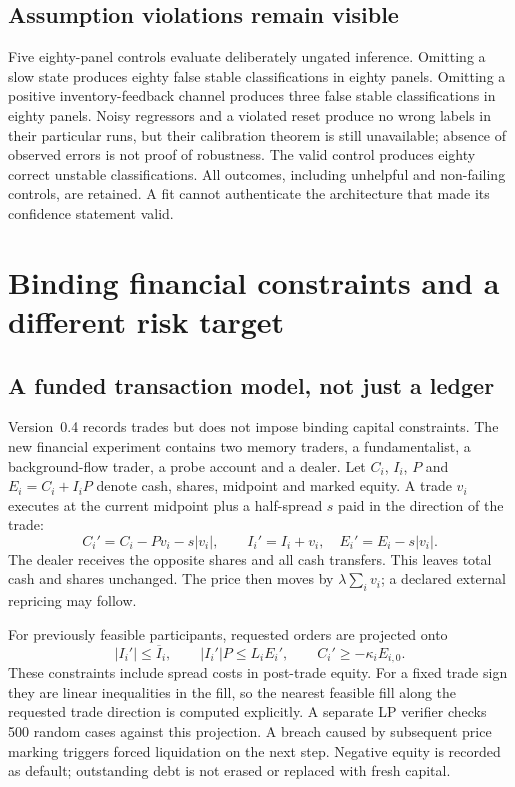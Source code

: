 \subsection{Assumption violations remain visible}
Five eighty-panel controls evaluate deliberately ungated inference. Omitting a slow state produces eighty false stable classifications in eighty panels. Omitting a positive inventory-feedback channel produces three false stable classifications in eighty panels. Noisy regressors and a violated reset produce no wrong labels in their particular runs, but their calibration theorem is still unavailable; absence of observed errors is not proof of robustness. The valid control produces eighty correct unstable classifications. All outcomes, including unhelpful and non-failing controls, are retained. A fit cannot authenticate the architecture that made its confidence statement valid.

\section{Binding financial constraints and a different risk target}
\label{sec:binding_finance}
\subsection{A funded transaction model, not just a ledger}
Version~0.4 records trades but does not impose binding capital constraints. The new financial experiment contains two memory traders, a fundamentalist, a background-flow trader, a probe account and a dealer. Let $C_i$, $I_i$, $P$ and $E_i=C_i+I_iP$ denote cash, shares, midpoint and marked equity. A trade $v_i$ executes at the current midpoint plus a half-spread $s$ paid in the direction of the trade:
\begin{equation}
 C_i'=C_i-Pv_i-s|v_i|,\qquad I_i'=I_i+v_i,
 \quad E_i'=E_i-s|v_i|.
 \label{eq:funded_settlement}
\end{equation}
The dealer receives the opposite shares and all cash transfers. This leaves total cash and shares unchanged. The price then moves by $\lambda\sum_i v_i$; a declared external repricing may follow.

For previously feasible participants, requested orders are projected onto
\begin{equation}
 |I_i'|\le \overline I_i,\qquad |I_i'|P\le L_i E_i',\qquad
 C_i'\ge-\kappa_i E_{i,0}.
 \label{eq:binding_limits}
\end{equation}
These constraints include spread costs in post-trade equity. For a fixed trade sign they are linear inequalities in the fill, so the nearest feasible fill along the requested trade direction is computed explicitly. A separate LP verifier checks 500 random cases against this projection. A breach caused by subsequent price marking triggers forced liquidation on the next step. Negative equity is recorded as default; outstanding debt is not erased or replaced with fresh capital.

